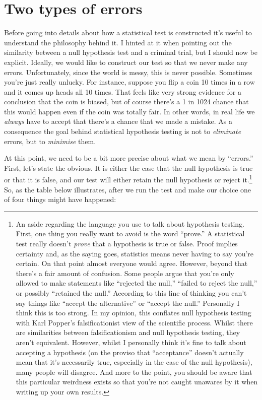 \documentclass[
]{book}
\begin{document}
\hypertarget{errortypes}{%
\section{Two types of errors}\label{errortypes}}

Before going into details about how a statistical test is constructed it's useful to understand the philosophy behind it. I hinted at it when pointing out the similarity between a null hypothesis test and a criminal trial, but I should now be explicit. Ideally, we would like to construct our test so that we never make any errors. Unfortunately, since the world is messy, this is never possible. Sometimes you're just really unlucky. For instance, suppose you flip a coin 10 times in a row and it comes up heads all 10 times. That feels like very strong evidence for a conclusion that the coin is biased, but of course there's a 1 in 1024 chance that this would happen even if the coin was totally fair. In other words, in real life we \emph{always} have to accept that there's a chance that we made a mistake. As a consequence the goal behind statistical hypothesis testing is not to \emph{eliminate} errors, but to \emph{minimise} them.

At this point, we need to be a bit more precise about what we mean by ``errors.'' First, let's state the obvious. It is either the case that the null hypothesis is true or that it is false, and our test will either retain the null hypothesis or reject it.\footnote{An aside regarding the language you use to talk about hypothesis testing. First, one thing you really want to avoid is the word ``prove.'' A statistical test really doesn't \emph{prove} that a hypothesis is true or false. Proof implies certainty and, as the saying goes, statistics means never having to say you're certain. On that point almost everyone would agree. However, beyond that there's a fair amount of confusion. Some people argue that you're only allowed to make statements like ``rejected the null,'' ``failed to reject the null,'' or possibly ``retained the null.'' According to this line of thinking you can't say things like ``accept the alternative'' or ``accept the null.'' Personally I think this is too strong. In my opinion, this conflates null hypothesis testing with Karl Popper's falsificationist view of the scientific process. Whilst there are similarities between falsificationism and null hypothesis testing, they aren't equivalent. However, whilst I personally think it's fine to talk about accepting a hypothesis (on the proviso that ``acceptance'' doesn't actually mean that it's necessarily true, especially in the case of the null hypothesis), many people will disagree. And more to the point, you should be aware that this particular weirdness exists so that you're not caught unawares by it when writing up your own results.} So, as the table below illustrates, after we run the test and make our choice one of four things might have happened:
\end{document}
